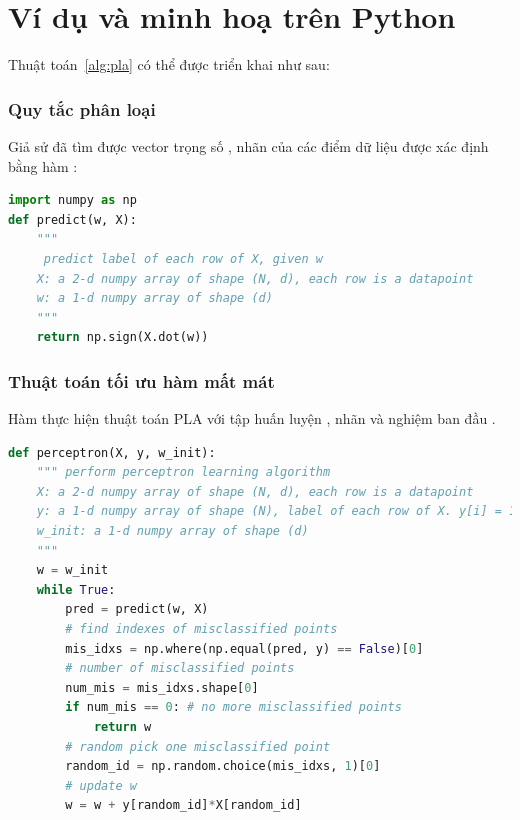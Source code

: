  

\section{Ví dụ và minh hoạ trên Python}
Thuật toán~\ref{alg:pla} có thể được triển khai như sau:

\subsubsection{Quy tắc phân loại}
Giả sử đã tìm được vector trọng số , nhãn của các điểm dữ liệu  được xác định bằng hàm :    
\begin{lstlisting}[language=Python]
import numpy as np 
def predict(w, X):  
    """
     predict label of each row of X, given w
    X: a 2-d numpy array of shape (N, d), each row is a datapoint 
    w: a 1-d numpy array of shape (d)  
    """
    return np.sign(X.dot(w))
\end{lstlisting}
\subsubsection{Thuật toán tối ưu hàm mất mát}
Hàm  thực hiện thuật toán PLA với tập
huấn luyện , nhãn  và nghiệm ban đầu
.

\begin{lstlisting}[language=Python]
def perceptron(X, y, w_init):
    """ perform perceptron learning algorithm
    X: a 2-d numpy array of shape (N, d), each row is a datapoint 
    y: a 1-d numpy array of shape (N), label of each row of X. y[i] = 1/-1
    w_init: a 1-d numpy array of shape (d) 
    """
    w = w_init
    while True:
        pred = predict(w, X)
        # find indexes of misclassified points
        mis_idxs = np.where(np.equal(pred, y) == False)[0]
        # number of misclassified points
        num_mis = mis_idxs.shape[0]
        if num_mis == 0: # no more misclassified points
            return w
        # random pick one misclassified point 
        random_id = np.random.choice(mis_idxs, 1)[0]
        # update w 
        w = w + y[random_id]*X[random_id]
\end{lstlisting}


